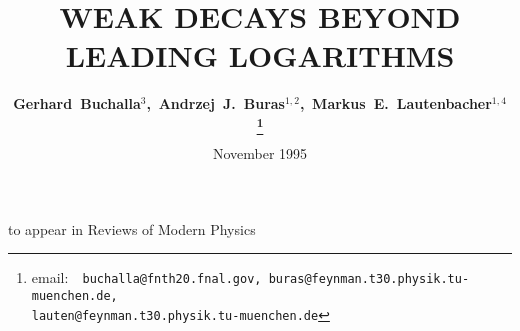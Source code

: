 \renewcommand{\thefootnote}{\fnsymbol{footnote}}


\title{WEAK DECAYS BEYOND LEADING LOGARITHMS}

\author{\bf
        Gerhard~{Buchalla}${}^{3}$,\,
        Andrzej~J.~{Buras}${}^{1,2}$,\,
        Markus~E.~{Lautenbacher}${}^{1,4}$
        \footnote{email:~{\tt
buchalla@fnth20.fnal.gov,\,buras@feynman.t30.physik.tu-muenchen.de, \\
\phantom{XXXXXX}lauten@feynman.t30.physik.tu-muenchen.de}}
}

\address{
\ \\
${}^{1}$ Physik Department, Technische Universit\"at M\"unchen, \\
D-85748 Garching, Germany.
\\
${}^{2}$ Max-Planck-Institut f\"ur Physik -- Werner-Heisenberg-Institut, \\
F\"ohringer Ring 6, D-80805 M\"unchen, Germany.
\\
${}^{3}$ Theoretical Physics Department,  \\
Fermi National Accelerator Laboratory, \\
P.O.\ Box 500, Batavia, IL 60510, USA.
\\
${}^{4}$ SLAC Theory Group, Stanford University, \\
P.O.\ Box 4349, Stanford, CA 94309, USA.
\\
\ 
}

\date{November 1995}

\maketitle
\thispagestyle{empty}

\centerline{to appear in Reviews of Modern Physics}

